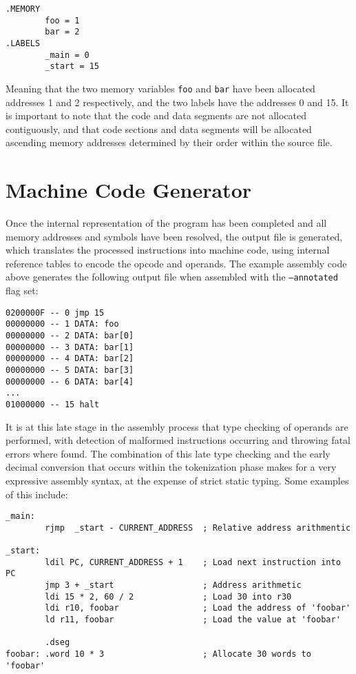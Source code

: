 \documentclass[12pt,twoside]{report}
\begin{document}
\begin{verbatim}
.MEMORY
        foo = 1
        bar = 2
.LABELS
        _main = 0
        _start = 15
\end{verbatim}

\noindent
Meaning that the two memory variables \texttt{foo} and \texttt{bar}
have been allocated addresses 1 and 2 respectively, and the two labels
have the addresses 0 and 15. It is important to note that the code and
data segments are not allocated contiguously, and that code sections
and data segments will be allocated ascending memory addresses
determined by their order within the source file.

\section{Machine Code Generator}

Once the internal representation of the program has been completed and
all memory addresses and symbols have been resolved, the output file
is generated, which translates the processed instructions into machine
code, using internal reference tables to encode the opcode and
operands. The example assembly code above generates the following
output file when assembled with the \texttt{--annotated} flag set:

\begin{verbatim}
0200000F -- 0 jmp 15
00000000 -- 1 DATA: foo
00000000 -- 2 DATA: bar[0]
00000000 -- 3 DATA: bar[1]
00000000 -- 4 DATA: bar[2]
00000000 -- 5 DATA: bar[3]
00000000 -- 6 DATA: bar[4]
...
01000000 -- 15 halt
\end{verbatim}

\noindent
It is at this late stage in the assembly process that type checking of
operands are performed, with detection of malformed instructions
occurring and throwing fatal errors where found. The combination of
this late type checking and the early decimal conversion that occurs
within the tokenization phase makes for a very expressive assembly
syntax, at the expense of strict static typing. Some examples of this
include:

\begin{verbatim}
_main:
        rjmp  _start - CURRENT_ADDRESS  ; Relative address arithmentic

_start:
        ldil PC, CURRENT_ADDRESS + 1    ; Load next instruction into PC
        jmp 3 + _start                  ; Address arithmetic
        ldi 15 * 2, 60 / 2              ; Load 30 into r30
        ldi r10, foobar                 ; Load the address of 'foobar'
        ld r11, foobar                  ; Load the value at 'foobar'

        .dseg
foobar: .word 10 * 3                    ; Allocate 30 words to 'foobar'
\end{verbatim}
\end{document}
